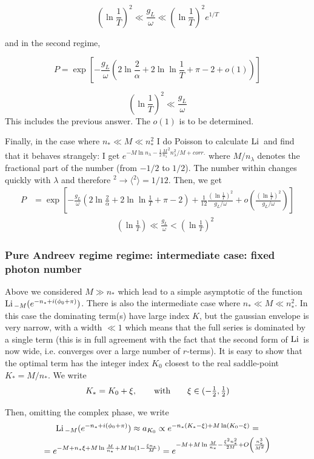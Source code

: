 \[
(\ln\frac{1}{T})^{2}\ll\frac{g_{L}}{\omega}\ll(\ln\frac{1}{T})^{2}e^{1/T}
\]

and in the second regime,

\[
P=\exp\left[-\frac{g_{L}}{\omega}\left(2\ln\frac{2}{\alpha}+2\ln\ln\frac{1}{T}+\pi-2+o(1)\right)\right]
\]

\[
(\ln\frac{1}{T})^{2}\ll\frac{g_{L}}{\omega}
\]
This includes the previous answer. The $o(1)$ is to be determined.

Finally, in the case where $n_{*}\ll M\ll n_{*}^{2}$ I do Poisson
to calculate $\mathrm{Li}\,$ and find that it behaves strangely: I get $e^{-M\ln n_{\lambda}-\frac{1}{2}{\frac{M}{n_{\lambda}}}^{2}n_{\lambda}^{2}/M+corr.}$
where ${M/n_{\lambda}}$ denotes the fractional part of the number
(from $-1/2$ to $1/2$). The number within changes quickly with $\lambda$
and therefore $^{2}\rightarrow\langle{}^{2}\rangle=1/12$. Then, we
get
\begin{align}
P & =\exp\left[-\frac{g_{L}}{\omega}\left(2\ln\frac{2}{\alpha}+2\ln\ln\frac{1}{T}+\pi-2\right)+\frac{1}{12}\frac{(\ln\frac{1}{T})^{2}}{g_{L}/\omega}+o\left(\frac{(\ln\frac{1}{T})^{2}}{g_{L}/\omega}\right)\right]
\end{align}
\begin{gather}
	\qquad(\ln\frac{1}{T})\ll\frac{g_{L}}{\omega}<(\ln\frac{1}{T})^{2}\
\end{gather}

\subsubsection{Pure Andreev regime regime: intermediate case: fixed photon number}

Above we considered $M\gg n_{*}$ which lead to a simple asymptotic
of the function $\mathrm{Li}\,_{-M}(e^{-n_{*}+i(\phi_{0}+\pi)})$. There is
also the intermediate case where $n_{*}\ll M\ll n_{*}^{2}$. In this
case the dominating term(s) have large index $K$, but the gaussian
envelope is very narrow, with a width $\ll1$ which means that the
full series is dominated by a single term (this is in full agreement
with the fact that the second form of $\mathrm{Li}\,$ is now wide, i.e. converges
over a large number of $r$-terms). It is easy to show that the optimal
term has the integer index $K_{0}$ closest to the real saddle-point
$K_{*}=M/n_{*}$. We write
\[
K_{*}=K_{0}+\xi,\qquad\mbox{with\ensuremath{\qquad\xi\in(-\frac{1}{2},\frac{1}{2})}}
\]

Then, omitting the complex phase, we write
\begin{multline*}
\mathrm{Li}\,_{-M}(e^{-n_{*}+i(\phi_{0}+\pi)})\approx a_{K_{0}}\propto e^{-n_{*}(K_{*}-\xi)+M\ln(K_{0}-\xi)}=\\
=e^{-M+n_{*}\xi+M\ln\frac{M}{n_{*}}+M\ln(1-\frac{\xi n_{*}}{M})}=e^{-M+M\ln\frac{M}{n_{*}}-\frac{\xi^{2}n_{*}^{2}}{2M}+O\left(\frac{n_{*}^{3}}{M^{2}}\right)}\\
\end{multline*}

